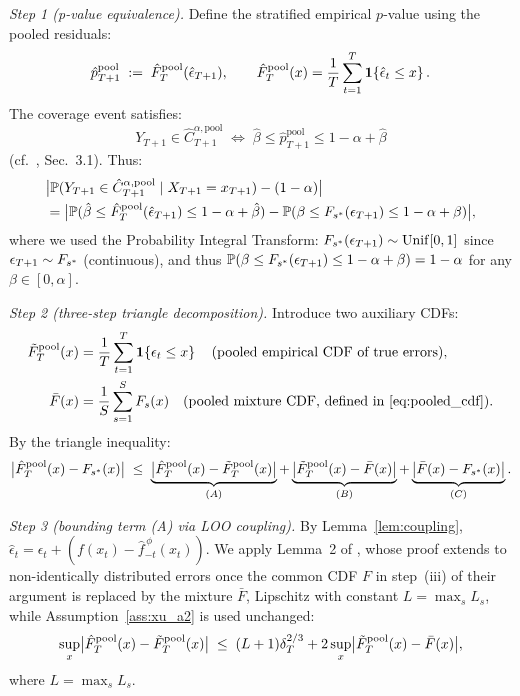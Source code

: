 \medskip
\noindent\textit{Step 1 (p-value equivalence).}
Define the stratified empirical $p$-value using the pooled residuals:
\[
  \hat{p}_{T+1}^{\text{pool}}
  \;:=\;
  \hat{F}_T^{\text{pool}}(\hat{\epsilon}_{T+1}),
  \qquad
  \hat{F}_T^{\text{pool}}(x)
  = \frac{1}{T}\sum_{t=1}^T \mathbf{1}\!\left\{\hat{\epsilon}_t \leq x\right\}.
\]
The coverage event satisfies:
\begin{equation}
  \label{eq:pval_equiv}
  Y_{T+1} \in \hat{C}_{T+1}^{\alpha,\text{pool}}
  \;\iff\;
  \hat{\beta} \leq \hat{p}_{T+1}^{\text{pool}} \leq 1-\alpha+\hat{\beta}
\end{equation}
(cf.\ \citealt{xu2023conformal}, Sec.~3.1).  Thus:
\begin{align}
  \label{eq:gap_start}
  &\bigl|\mathbb{P}(Y_{T+1} \in \hat{C}_{T+1}^{\alpha,\text{pool}} \mid X_{T+1}=x_{T+1}) - (1-\alpha)\bigr|
  \notag\\
  &= \bigl|\mathbb{P}(\hat{\beta} \leq \hat{F}_T^{\text{pool}}(\hat{\epsilon}_{T+1}) \leq 1-\alpha+\hat{\beta})
     - \mathbb{P}(\beta \leq F_{s^*}(\epsilon_{T+1}) \leq 1-\alpha+\beta)\bigr|,
\end{align}
where we used the Probability Integral Transform:
$F_{s^*}(\epsilon_{T+1}) \sim \mathrm{Unif}[0,1]$ since
$\epsilon_{T+1} \sim F_{s^*}$ (continuous), and thus
$\mathbb{P}(\beta \leq F_{s^*}(\epsilon_{T+1}) \leq 1-\alpha+\beta)
= 1-\alpha$ for any $\beta \in [0,\alpha]$.

\medskip
\noindent\textit{Step 2 (three-step triangle decomposition).}
Introduce two auxiliary CDFs:
\begin{align}
  \tilde{F}_T^{\text{pool}}(x)
  &= \frac{1}{T}\sum_{t=1}^T \mathbf{1}\!\left\{\epsilon_t \leq x\right\}
  \quad\text{(pooled empirical CDF of true errors)}, \notag\\
  \bar{F}(x)
  &= \frac{1}{S}\sum_{s=1}^S F_s(x)
  \quad\text{(pooled mixture CDF, defined in~\eqref{eq:pooled_cdf})}. \notag
\end{align}
By the triangle inequality:
\begin{equation}
  \label{eq:three_step}
  \bigl|\hat{F}_T^{\text{pool}}(x) - F_{s^*}(x)\bigr|
  \;\leq\;
  \underbrace{\bigl|\hat{F}_T^{\text{pool}}(x) - \tilde{F}_T^{\text{pool}}(x)\bigr|}_{(A)}
  +
  \underbrace{\bigl|\tilde{F}_T^{\text{pool}}(x) - \bar{F}(x)\bigr|}_{(B)}
  +
  \underbrace{\bigl|\bar{F}(x) - F_{s^*}(x)\bigr|}_{(C)}.
\end{equation}

\medskip
\noindent\textit{Step 3 (bounding term (A) via LOO coupling).}
By Lemma~\ref{lem:coupling}, $\hat{\epsilon}_t = \epsilon_t +
(f(x_t) - \hat{f}_{-t}^{\,\phi}(x_t))$.  We apply Lemma~2 of
\citet{xu2023conformal}, whose proof extends to non-identically
distributed errors once the common CDF $F$ in step~(iii) of their
argument is replaced by the mixture $\bar{F}$, Lipschitz with
constant $L = \max_s L_s$, while Assumption~\ref{ass:xu_a2} is used
unchanged:
\[
  \sup_x\bigl|\hat{F}_T^{\text{pool}}(x) - \tilde{F}_T^{\text{pool}}(x)\bigr|
  \;\leq\;
  (L+1)\delta_T^{2/3} + 2\sup_x\bigl|\tilde{F}_T^{\text{pool}}(x) - \bar{F}(x)\bigr|,
\]
where $L = \max_s L_s$.

